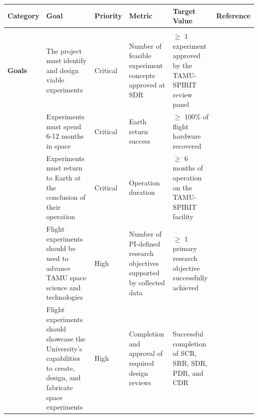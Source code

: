 \documentclass[conf]{new-aiaa}
\begin{document}
\begin{table}[!htbp]
    \centering
    \footnotesize
    \setlength{\tabcolsep}{4pt}
    \renewcommand{\arraystretch}{1.15}
    \begin{tabularx}{\textwidth}{@{}>{\centering\arraybackslash}m{1.6cm}
                                    >{\raggedright\arraybackslash}X
                                    >{\centering\arraybackslash}p{1.4cm}
                                    >{\raggedright\arraybackslash}p{2.6cm}
                                    >{\raggedright\arraybackslash}p{2.6cm}
                                    >{\centering\arraybackslash}p{0.9cm}@{}}
    \toprule
    \textbf{Category} &
    \textbf{Goal} &
    \textbf{Priority} &
    \textbf{Metric} &
    \textbf{Target Value} &
    \textbf{Reference} \\
    \midrule
    \multirow{17}{*}{\shortstack[c]{\textbf{Program}\\\textbf{Goals}}}
    & The project must identify and design viable experiments
    & Critical
    & Number of feasible experiment concepts approved at SDR
    & $\geq$ 1 experiment approved by the TAMU-SPIRIT review panel
    &\cite{tamu-spirit-rfp}\\

    \cmidrule(lr){2-6}
    & Experiments must spend 6-12 months in space
    & Critical
    & Earth return success
    & $\geq$ 100\% of flight hardware recovered
    &\cite{tamu-spirit-rfp}\\

    \cmidrule(lr){2-6}
    & Experiments must return to Earth at the conclusion of their operation
    & Critical
    & Operation duration
    & $\geq$ 6 months of operation on the TAMU-SPIRIT facility
    &\cite{tamu-spirit-rfp}\\

    \cmidrule(lr){2-6}
    & Flight experiments should be used to advance TAMU space science and technologies
    & High
    & Number of PI-defined research objectives supported by collected data
    & $\geq$ 1 primary research objective successfully achieved
    &\cite{tamu-spirit-rfp}\\

    \cmidrule(lr){2-6}
    & Flight experiments should showcase the University's capabilities to create, design, and fabricate space experiments
    & High
    & Completion and approval of required design reviews
    & Successful completion of SCR, SRR, SDR, PDR, and CDR
    &\cite{tamu-spirit-rfp}\\


\end{tabularx}
\end{table}
\end{document}

